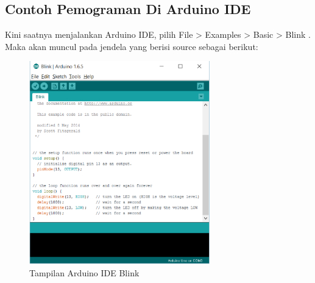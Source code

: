 \subsection{Contoh Pemograman Di Arduino IDE}
Kini saatnya menjalankan Arduino IDE, pilih File > Examples > Basic > Blink  . Maka akan muncul pada jendela yang berisi source sebagai berikut:
\begin{figure}[H]
\centering
\includegraphics[width=0.7\textwidth]{figures/ide4.png}
\caption{Tampilan Arduino IDE Blink}
\label{print}
\end{figure}

